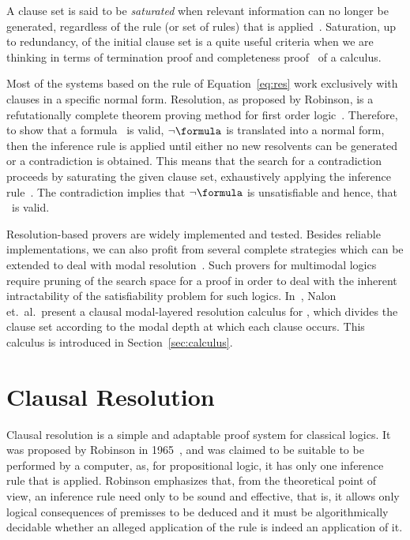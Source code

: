 A clause set is said to be \emph{saturated} when relevant information can no
longer be generated, regardless of the rule (or set of rules) that is
applied~\cite{dershowitz2003abstract}. Saturation, up to redundancy, of the
initial clause set is a quite useful criteria when we are thinking in terms of
termination proof and completeness proof~\cite{fitting} of a calculus.

Most of the systems based on the rule of Equation~\ref{eq:res} work exclusively
with clauses in a specific normal form. Resolution, as proposed by Robinson, is
a refutationally complete theorem proving method for first order
logic~\cite{Robinson65}.  Therefore, to show that a formula \formula~is valid,
$\neg \formula$ is translated into a normal form, then the inference rule is
applied until either no new resolvents can be generated or a contradiction is
obtained. This means that the search for a contradiction proceeds by saturating
the given clause set, exhaustively applying the inference
rule~\cite{bachmair2001resolution}. The contradiction implies that $\neg
\formula$ is unsatisfiable and hence, that \formula~is valid. 

Resolution-based provers are widely implemented and tested. Besides reliable
implementations, we can also profit from several complete strategies which can
be extended to deal with modal resolution~\cite{journals/jal/NalonD07}. Such
provers for multimodal logics require pruning of the search space for a proof in
order to deal with the inherent intractability of the satisfiability problem for
such logics. In~\cite{nalon2015modal}, Nalon et.\ al.\ present a clausal
modal-layered resolution calculus for , which divides the clause
set according to the modal depth at which each clause occurs. This calculus is
introduced in Section~\ref{sec:calculus}.

\section{Clausal Resolution}

Clausal resolution is a simple and adaptable proof system for classical logics.
It was proposed by Robinson in 1965~\cite{Robinson65}, and was claimed to be
suitable to be performed by a computer, as, for propositional logic, it has only
one inference rule that is applied. Robinson emphasizes that, from the
theoretical point of view, an inference rule need only to be sound and
effective, that is, it allows only logical consequences of premisses to be
deduced and it must be algorithmically decidable whether an alleged application
of the rule is indeed an application of it.

